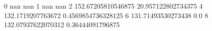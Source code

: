 0 nan nan
1 nan nan
2 152.67205810546875 20.957122802734375
4 132.1719207763672 0.4569854736328125
6 131.71493530273438 0.0
8 132.07937622070312 0.36444091796875

